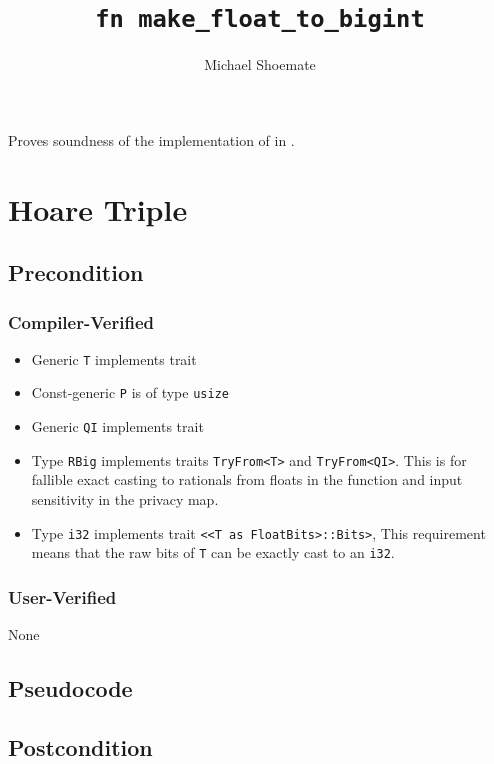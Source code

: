 \documentclass{article}
\title{\texttt{fn make\_float\_to\_bigint}}
\author{Michael Shoemate}
\date{}
\begin{document}
\maketitle

\contrib
Proves soundness of the implementation of  in .

\section{Hoare Triple}
\subsection*{Precondition}
\subsubsection*{Compiler-Verified}

\begin{itemize}
    \item Generic \texttt{T} implements trait 
    \item Const-generic \texttt{P} is of type \texttt{usize}
    \item Generic \texttt{QI} implements trait 
    \item Type \texttt{RBig} implements traits \texttt{TryFrom<T>} and \texttt{TryFrom<QI>}.
        This is for fallible exact casting to rationals from floats in the function and input sensitivity in the privacy map.
    \item Type \texttt{i32} implements trait \texttt{<<T as FloatBits>::Bits>},
        This requirement means that the raw bits of \texttt{T} can be exactly cast to an \texttt{i32}.
\end{itemize}

\subsubsection*{User-Verified}
None

\subsection*{Pseudocode}


\subsection*{Postcondition}
\begin{theorem}
\end{theorem}
\end{document}
